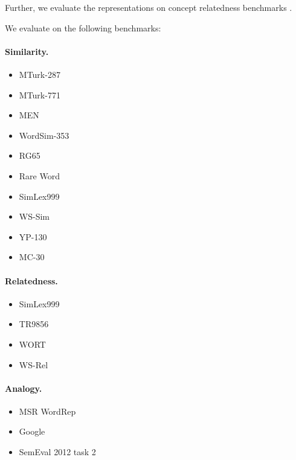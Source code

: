 \documentclass{article}
\begin{document}
    Further, we evaluate the representations on concept relatedness benchmarks
\cite{levy2015tr9856,eindor2018semantic}.
    
    We evaluate on the following benchmarks:
    
    \paragraph{Similarity.}
    
    \begin{itemize}
        \item MTurk-287 \cite{radinsky2011word}
        \item MTurk-771 \cite{halawi2012large}
        \item MEN \cite{bruni2012distributional}
        \item WordSim-353 \cite{finkelstein2001placing}
        \item RG65 \cite{rubenstein1965contextual}
        \item Rare Word \cite{luong2013better}
        \item SimLex999 \cite{hill2015simlex}
        \item WS-Sim \cite{agirre2009study}
        \item YP-130 \cite{yang2006verb}
        \item MC-30 \cite{miller1991contextual}
    \end{itemize}
    
    \paragraph{Relatedness.}
    
    \begin{itemize}
        \item SimLex999 \cite{hill2015simlex}
        \item TR9856 \cite{levy2015tr9856}
        \item WORT \cite{eindor2018semantic}
        \item WS-Rel \cite{agirre2009study}
    \end{itemize}
    
    \paragraph{Analogy.}
    
    \begin{itemize}
        \item MSR WordRep \cite{gao2014wordrep}
        \item Google \cite{mikolov2013distributed}
        \item SemEval 2012 task 2 \cite{jurgens2012semeval}
    \end{itemize}
    
\end{document}
